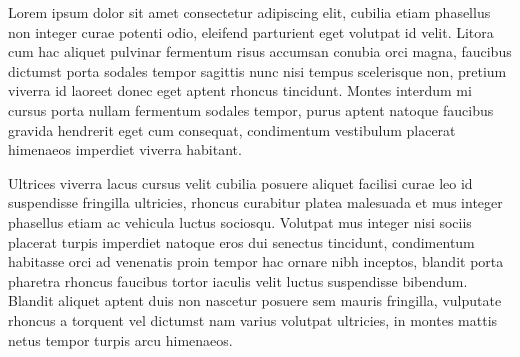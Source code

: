 \documentclass{article}
\begin{document}
	\begin{multicols}{3}
		Lorem ipsum dolor sit amet consectetur adipiscing elit, cubilia etiam phasellus non integer curae potenti odio, eleifend parturient eget volutpat id velit. Litora cum hac aliquet pulvinar fermentum risus accumsan conubia orci magna, faucibus dictumst porta sodales tempor sagittis nunc nisi tempus scelerisque non, pretium viverra id laoreet donec eget aptent rhoncus tincidunt. Montes interdum mi cursus porta nullam fermentum sodales tempor, purus aptent natoque faucibus gravida hendrerit eget cum consequat, condimentum vestibulum placerat himenaeos imperdiet viverra habitant.
		
		Ultrices viverra lacus cursus velit cubilia posuere aliquet facilisi curae leo id suspendisse fringilla ultricies, rhoncus curabitur platea malesuada et mus integer phasellus etiam ac vehicula luctus sociosqu. Volutpat mus integer nisi sociis placerat turpis imperdiet natoque eros dui senectus tincidunt, condimentum habitasse orci ad venenatis proin tempor hac ornare nibh inceptos, blandit porta pharetra rhoncus faucibus tortor iaculis velit luctus suspendisse bibendum. Blandit aliquet aptent duis non nascetur posuere sem mauris fringilla, vulputate rhoncus a torquent vel dictumst nam varius volutpat ultricies, in montes mattis netus tempor turpis arcu himenaeos.
		

\end{multicols}
\end{document}
